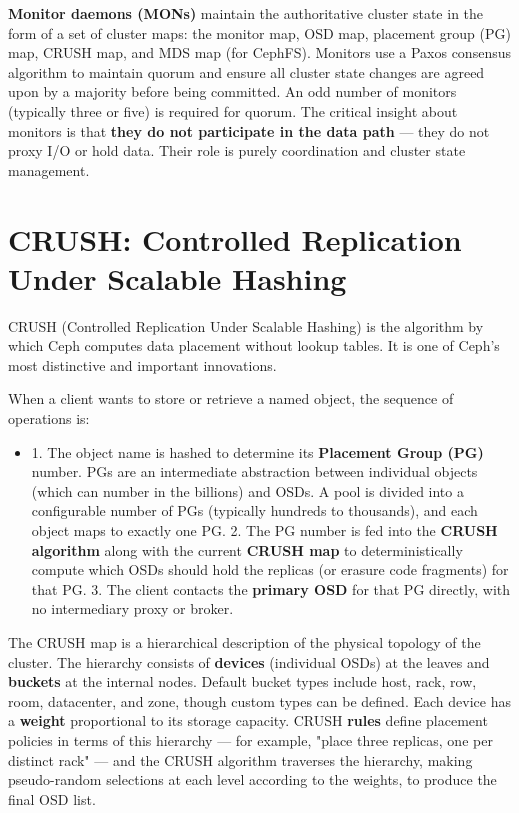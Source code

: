 \textbf{Monitor daemons (MONs)} maintain the authoritative cluster state in the form of a set of cluster maps: the monitor map, OSD map, placement group (PG) map, CRUSH map, and MDS map (for CephFS). Monitors use a Paxos consensus algorithm to maintain quorum and ensure all cluster state changes are agreed upon by a majority before being committed. An odd number of monitors (typically three or five) is required for quorum. The critical insight about monitors is that \textbf{they do not participate in the data path} --- they do not proxy I/O or hold data. Their role is purely coordination and cluster state management.

\section{CRUSH: Controlled Replication Under Scalable Hashing}
CRUSH (Controlled Replication Under Scalable Hashing) is the algorithm by which Ceph computes data placement without lookup tables. It is one of Ceph's most distinctive and important innovations.

When a client wants to store or retrieve a named object, the sequence of operations is:

\begin{itemize}
  \item 1. The object name is hashed to determine its \textbf{Placement Group (PG)} number. PGs are an intermediate abstraction between individual objects (which can number in the billions) and OSDs. A pool is divided into a configurable number of PGs (typically hundreds to thousands), and each object maps to exactly one PG.
2. The PG number is fed into the \textbf{CRUSH algorithm} along with the current \textbf{CRUSH map} to deterministically compute which OSDs should hold the replicas (or erasure code fragments) for that PG.
3. The client contacts the \textbf{primary OSD} for that PG directly, with no intermediary proxy or broker.
\end{itemize}

The CRUSH map is a hierarchical description of the physical topology of the cluster. The hierarchy consists of \textbf{devices} (individual OSDs) at the leaves and \textbf{buckets} at the internal nodes. Default bucket types include host, rack, row, room, datacenter, and zone, though custom types can be defined. Each device has a \textbf{weight} proportional to its storage capacity. CRUSH \textbf{rules} define placement policies in terms of this hierarchy --- for example, "place three replicas, one per distinct rack" --- and the CRUSH algorithm traverses the hierarchy, making pseudo-random selections at each level according to the weights, to produce the final OSD list.


